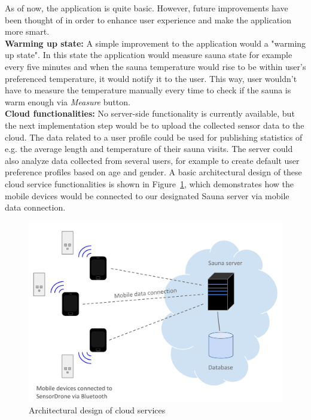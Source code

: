 \documentclass[11pt]{article}
\begin{document}
As of now, the application is quite basic. However, future improvements have been thought of in order to enhance user experience and make the application more smart. \\

\noindent\textbf{Warming up state:} A simple improvement to the application would a "warming up state". In this state the application would measure sauna state for example every five minutes and when the sauna temperature would rise to be within user's preferenced temperature, it would notify it to the user. This way, user wouldn't have to measure the temperature manually every time to check if the sauna is warm enough via \textit{Measure} button. \\

\noindent\textbf{Cloud functionalities:} No server-side functionality is currently available, but the next implementation step would be to upload the collected sensor data to the cloud. The data related to a user profile could be used for publishing statistics of e.g. the average length and temperature of their sauna visits. The server could also analyze data collected from several users, for example to create default user preference profiles based on age and gender. A basic architectural design of these cloud service functionalities is shown in Figure~\ref{fig:CloudArc}, which demonstrates how the mobile devices would be connected to our designated Sauna server via mobile data connection. \\

\begin{figure}[h!]
\includegraphics[width=\textwidth, height=\textheight, keepaspectratio]{design.pdf}
\caption{Architectural design of cloud services}
\label{fig:CloudArc}
\end{figure}
\end{document}
